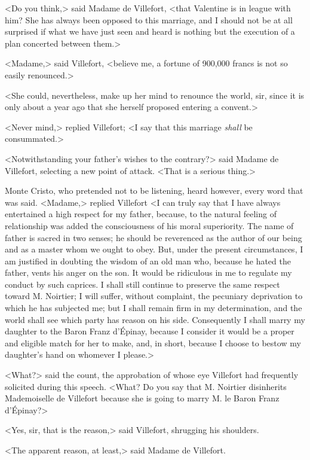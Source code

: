  <Do you think,> said Madame de Villefort, <that Valentine is in league with him? She has always been opposed to this marriage, and I should not be at all surprised if what we have just seen and heard is nothing but the execution of a plan concerted between them.> 

 <Madame,> said Villefort, <believe me, a fortune of 900,000 francs is not so easily renounced.> 

 <She could, nevertheless, make up her mind to renounce the world, sir, since it is only about a year ago that she herself proposed entering a convent.> 

 <Never mind,> replied Villefort; <I say that this marriage \textit{shall} be consummated.> 

 <Notwithstanding your father's wishes to the contrary?> said Madame de Villefort, selecting a new point of attack. <That is a serious thing.> 

 Monte Cristo, who pretended not to be listening, heard however, every word that was said.  <Madame,> replied Villefort <I can truly say that I have always entertained a high respect for my father, because, to the natural feeling of relationship was added the consciousness of his moral superiority. The name of father is sacred in two senses; he should be reverenced as the author of our being and as a master whom we ought to obey. But, under the present circumstances, I am justified in doubting the wisdom of an old man who, because he hated the father, vents his anger on the son. It would be ridiculous in me to regulate my conduct by such caprices. I shall still continue to preserve the same respect toward M. Noirtier; I will suffer, without complaint, the pecuniary deprivation to which he has subjected me; but I shall remain firm in my determination, and the world shall see which party has reason on his side. Consequently I shall marry my daughter to the Baron Franz d'Épinay, because I consider it would be a proper and eligible match for her to make, and, in short, because I choose to bestow my daughter's hand on whomever I please.> 

 <What?> said the count, the approbation of whose eye Villefort had frequently solicited during this speech. <What? Do you say that M. Noirtier disinherits Mademoiselle de Villefort because she is going to marry M. le Baron Franz d'Épinay?> 

 <Yes, sir, that is the reason,> said Villefort, shrugging his shoulders. 

 <The apparent reason, at least,> said Madame de Villefort. 

